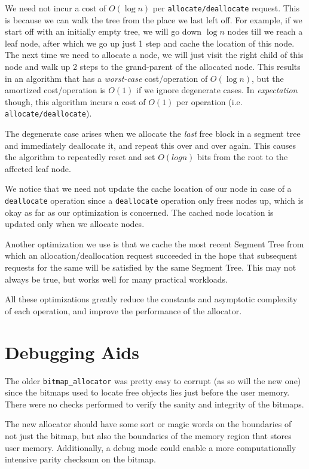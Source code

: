 \documentclass{article}
\begin{document}
We need not incur a cost of $O(\log{n})$ per
\texttt{allocate/deallocate} request. This is because we can walk the
tree from the place we last left off. For example, if we start off
with an initially empty tree, we will go down $\log{n}$ nodes till we
reach a leaf node, after which we go up just 1 step and cache the
location of this node. The next time we need to allocate a node, we
will just visit the right child of this node and walk up 2 steps to
the grand-parent of the allocated node. This results in an algorithm
that has a \textit{worst-case} cost/operation of $O(\log{n})$, but the
amortized cost/operation is $O(1)$ if we ignore degenerate cases. In
\textit{expectation} though, this algorithm incurs a cost of $O(1)$
per operation (i.e. \texttt{allocate/deallocate}).

The degenerate case arises when we allocate the \textit{last} free
block in a segment tree and immediately deallocate it, and repeat this
over and over again. This causes the algorithm to repeatedly reset and
set $O(log n)$ bits from the root to the affected leaf node.

We notice that we need not update the cache location of our node in
case of a \texttt{deallocate} operation since a \texttt{deallocate}
operation only frees nodes up, which is okay as far as our
optimization is concerned. The cached node location is updated only
when we allocate nodes.

Another optimization we use is that we cache the most recent Segment
Tree from which an allocation/deallocation request succeeded in the
hope that subsequent requests for the same will be satisfied by the
same Segment Tree. This may not always be true, but works well for
many practical workloads.

All these optimizations greatly reduce the constants and asymptotic
complexity of each operation, and improve the performance of the
allocator.


\section{Debugging Aids}

The older \texttt{bitmap\_allocator} was pretty easy to corrupt (as so
will the new one) since the bitmaps used to locate free objects lies
just before the user memory. There were no checks performed to verify
the sanity and integrity of the bitmaps.

The new allocator should have some sort or magic words on the
boundaries of not just the bitmap, but also the boundaries of the
memory region that stores user memory. Additionally, a debug mode
could enable a more computationally intensive parity checksum on the
bitmap.
\end{document}
